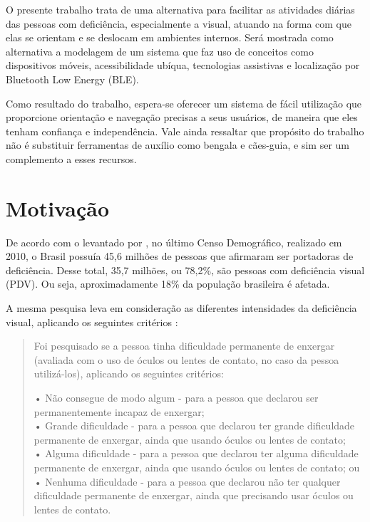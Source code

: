 \documentclass[english,brazilian]{UNISINOSmonografia}
\begin{document}
O presente trabalho trata de uma alternativa para facilitar as atividades diárias das pessoas com deficiência, especialmente a visual, atuando na forma com que elas se orientam e se deslocam em ambientes internos. Será mostrada como alternativa a modelagem de um sistema que faz uso de conceitos como dispositivos móveis, acessibilidade ubíqua, tecnologias assistivas e localização por Bluetooth Low Energy (BLE).

Como resultado do trabalho, espera-se oferecer um sistema de fácil utilização que proporcione orientação e navegação precisas a seus usuários, de maneira que eles tenham confiança e independência. Vale ainda ressaltar que propósito do trabalho não é substituir ferramentas de auxílio como bengala e cães-guia, e sim ser um complemento a esses recursos.

	\section{Motivação}


De acordo com o levantado por , no último Censo Demográfico, realizado em 2010, o Brasil possuía 45,6 milhões de pessoas que afirmaram ser portadoras de deficiência. Desse total, 35,7 milhões, ou 78,2\%, são pessoas com deficiência visual (PDV). Ou seja, aproximadamente 18\% da população brasileira é afetada.

A mesma pesquisa leva em consideração as diferentes intensidades da deficiência visual, aplicando os seguintes critérios \cite{IBGE2010}: 

\begin{quote}
	Foi pesquisado se a pessoa tinha dificuldade permanente de enxergar (avaliada com o uso de óculos ou lentes de contato, no caso da pessoa utilizá-los), aplicando os seguintes critérios:
		
	• Não consegue de modo algum - para a pessoa que declarou ser permanentemente incapaz de enxergar; \\
	• Grande dificuldade - para a pessoa que declarou ter grande dificuldade permanente de enxergar, ainda que usando óculos ou lentes de contato; \\
	• Alguma dificuldade - para a pessoa que declarou ter alguma dificuldade permanente de enxergar, ainda que usando óculos ou lentes de contato; ou \\
	• Nenhuma dificuldade - para a pessoa que declarou não ter qualquer dificuldade permanente de enxergar, ainda que precisando usar óculos ou lentes de contato.
\end{quote}
\end{document}
